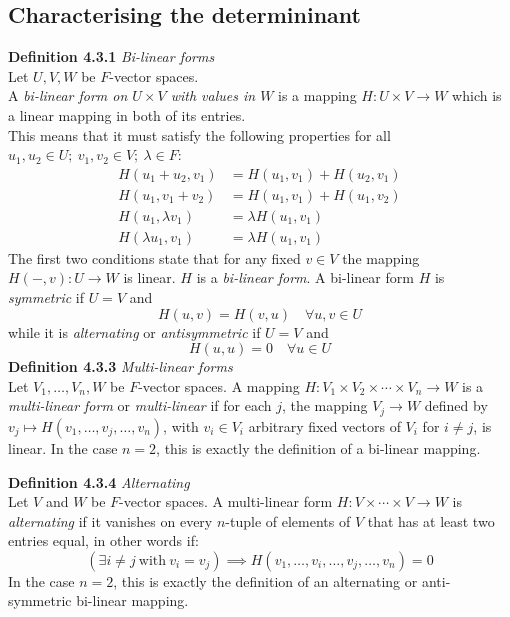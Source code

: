 \documentclass[8pt,landscape]{article}
\begin{document}
\begin{multicols}{3}
    \subsection{Characterising the determininant}

    \textbf{Definition 4.3.1} \emph{Bi-linear forms} \\
    Let $U,V, W$ be $F$-vector spaces. \\
    A \emph{bi-linear form on $U \times V$ with values in $W$} is a mapping
    $H:U \times V \to W$ which is a linear mapping in both of its entries. \\
    This means that it must satisfy the following properties for all
    $u_1, u_2 \in U; \ v_1, v_2 \in V; \ \lambda \in F$:
    \begin{align*}{}
        H(u_1 + u_2, v_1)   &= H(u_1, v_1) + H(u_2, v_1) \\
        H(u_1, v_1 + v_2)   &= H(u_1, v_1) + H(u_1, v_2) \\
        H(u_1, \lambda v_1) &= \lambda H(u_1, v_1) \\
        H(\lambda u_1, v_1) &= \lambda H(u_1, v_1)
    \end{align*}
    The first two conditions state that for any fixed $v \in V$ the mapping
    $H(-, v) : U \to W$ is linear.
    $H$ is a \emph{bi-linear form}.
    A bi-linear form $H$ is \emph{symmetric} if $U=V$ and
    \[
        H(u, v) = H(v, u) \quad \forall u, v \in U
    \]
    while it is \emph{alternating} or \emph{antisymmetric} if $U=V$ and
    \[
        H(u, u) = 0 \quad \forall u \in U
    \]
    \textbf{Definition 4.3.3} \emph{Multi-linear forms} \\
    Let $V_1, \ldots, V_n, W$ be $F$-vector spaces.
    A mapping $H : V_1 \times V_2 \times \cdots \times V_n \to W$ is a
    \emph{multi-linear form} or \emph{multi-linear} if for each $j$,
    the mapping $V_j \to W$ defined by $v_j \mapsto H(v_1, \ldots, v_j, \ldots, v_n)$,
    with $v_i \in V_i$ arbitrary fixed vectors of $V_i$ for $i \neq j$, is linear.
    In the case $n=2$, this is exactly the definition of a bi-linear mapping.

    \textbf{Definition 4.3.4} \emph{Alternating} \\
    Let $V$ and $W$ be $F$-vector spaces.
    A multi-linear form $H : V \times \cdots \times V \to W$
    is \emph{alternating} if it vanishes on every $n$-tuple of elements of $V$ that has at
    least two entries equal, in other words if:
    \[
        (\exists i \neq j \ \mathrm{with} \ v_i = v_j) \implies
        H(v_1, \ldots, v_i, \ldots, v_j, \ldots, v_n) = 0
    \]
    In the case $n=2$, this is exactly the definition of an alternating or
    anti-symmetric bi-linear mapping.


\end{multicols}
\end{document}
